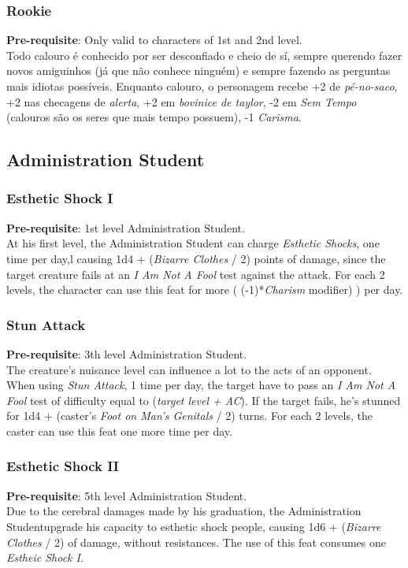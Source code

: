 \documentclass[ letterpaper,12pt]{article}
\begin{document}
\subsubsection{Rookie}
 {\bf Pre-requisite}: Only valid to characters of 1st and 2nd level.\\
 Todo calouro é conhecido por ser desconfiado e cheio de sí, sempre querendo fazer novos amiguinhos (já que não conhece ninguém) e sempre fazendo as perguntas mais idiotas possíveis. Enquanto calouro, o personagem recebe +2 de {\it pé-no-saco}, +2 nas checagens de {\it alerta}, +2 em {\it bovinice de taylor}, -2 em {\it Sem Tempo} (calouros são os seres que mais tempo possuem), -1 {\it Carisma}.

\subsection{Administration Student}

\subsubsection{Esthetic Shock I}
{\bf Pre-requisite}: 1st level Administration Student.\\
At his first level, the Administration Student can charge {\it Esthetic Shocks}, one time per day,l causing 1d4 + ({\it Bizarre Clothes} / 2) points of damage, since the target creature fails at an {\it I Am Not A Fool} test against the attack. For each 2 levels, the character can use this feat for more ( (-1)*{\it Charism} modifier) ) per day.

\subsubsection{Stun Attack}
 {\bf Pre-requisite}: 3th level Administration Student.\\
 The creature's nuisance level can influence a lot to the acts of an opponent. When using {\it Stun Attack}, 1 time per day, the target have to pass an {\it I Am Not A Fool} test of difficulty equal to ({\it target level + AC}). If the target fails, he's stunned for 1d4 + (caster's {\it Foot on Man's Genitals} / 2) turns. For each 2 levels, the caster can use this feat one more time per day. 

\subsubsection{Esthetic Shock II}
  {\bf Pre-requisite}: 5th level Administration Student.\\
  Due to the cerebral damages made by his graduation, the Administration Studentupgrade his capacity to esthetic shock people, causing 1d6 + ({\it Bizarre Clothes} / 2) of damage, without resistances. The use of this feat consumes one {\it Estheic Shock I}.
\end{document}
